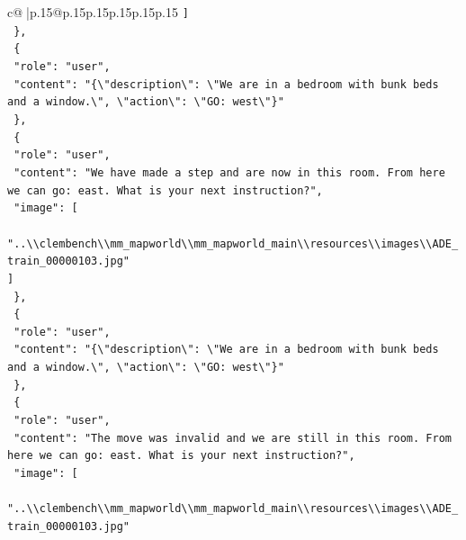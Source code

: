 \documentclass{article}
\begin{document}
{\begin{supertabular}{c@{$\;$}|p{.15\linewidth}@{}p{.15\linewidth}p{.15\linewidth}p{.15\linewidth}p{.15\linewidth}p{.15\linewidth}}
{{{\texttt{    {]}} \\
\texttt{  \},} \\
\texttt{  \{} \\
\texttt{    "role": "user",} \\
\texttt{    "content": "\{\textbackslash{}"description\textbackslash{}": \textbackslash{}"We are in a bedroom with bunk beds and a window.\textbackslash{}", \textbackslash{}"action\textbackslash{}": \textbackslash{}"GO: west\textbackslash{}"\}"} \\
\texttt{  \},} \\
\texttt{  \{} \\
\texttt{    "role": "user",} \\
\texttt{    "content": "We have made a step and are now in this room. From here we can go: east. What is your next instruction?",} \\
\texttt{    "image": {[}} \\
\texttt{      "..\textbackslash{}\textbackslash{}clembench\textbackslash{}\textbackslash{}mm\_mapworld\textbackslash{}\textbackslash{}mm\_mapworld\_main\textbackslash{}\textbackslash{}resources\textbackslash{}\textbackslash{}images\textbackslash{}\textbackslash{}ADE\_train\_00000103.jpg"} \\
\texttt{    {]}} \\
\texttt{  \},} \\
\texttt{  \{} \\
\texttt{    "role": "user",} \\
\texttt{    "content": "\{\textbackslash{}"description\textbackslash{}": \textbackslash{}"We are in a bedroom with bunk beds and a window.\textbackslash{}", \textbackslash{}"action\textbackslash{}": \textbackslash{}"GO: west\textbackslash{}"\}"} \\
\texttt{  \},} \\
\texttt{  \{} \\
\texttt{    "role": "user",} \\
\texttt{    "content": "The move was invalid and we are still in this room. From here we can go: east. What is your next instruction?",} \\
\texttt{    "image": {[}} \\
\texttt{      "..\textbackslash{}\textbackslash{}clembench\textbackslash{}\textbackslash{}mm\_mapworld\textbackslash{}\textbackslash{}mm\_mapworld\_main\textbackslash{}\textbackslash{}resources\textbackslash{}\textbackslash{}images\textbackslash{}\textbackslash{}ADE\_train\_00000103.jpg"} \\
}}}
\end{supertabular}}
\end{document}

